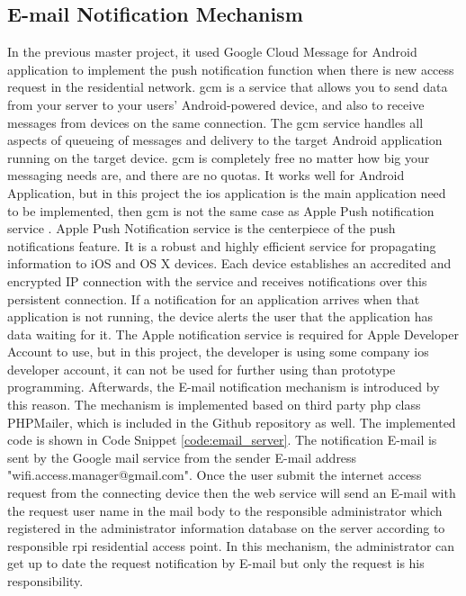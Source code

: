 \subsection{E-mail Notification Mechanism}
\par In the previous master project, it used Google Cloud Message\cite{gcm} for Android application to implement the push notification function when there is new access request in the residential network. \gls{gcm} is a service that allows you to send data from your server to your users' Android-powered device, and also to receive messages from devices on the same connection. The \gls{gcm} service handles all aspects of queueing of messages and delivery to the target Android application running on the target device. \gls{gcm} is completely free no matter how big your messaging needs are, and there are no quotas. It works well for Android Application, but in this project the \gls{ios} application is the main application need to be implemented, then \gls{gcm} is not the same case as Apple Push notification service \cite{apns}. Apple Push Notification service is the centerpiece of the push notifications feature. It is a robust and highly efficient service for propagating information to iOS and OS X devices. Each device establishes an accredited and encrypted IP connection with the service and receives notifications over this persistent connection. If a notification for an application arrives when that application is not running, the device alerts the user that the application has data waiting for it. The Apple notification service is required for Apple Developer Account to use, but in this project, the developer is using some company \gls{ios} developer account, it can not be used for further using than prototype programming. Afterwards, the E-mail notification mechanism is introduced by this reason. The mechanism is implemented based on third party \gls{php} class PHPMailer, which is included in the Github repository as well. The implemented code is shown in Code Snippet \ref{code:email_server}. The notification E-mail is sent by the Google mail service from the sender E-mail address "wifi.access.manager@gmail.com". Once the user submit the internet access request from the connecting device then the web service will send an E-mail with the request user name in the mail body to the responsible administrator which registered in the administrator information database on the server according to responsible \gls{rpi} residential access point. In this mechanism, the administrator can get up to date the request notification by E-mail but only the request is his responsibility.


